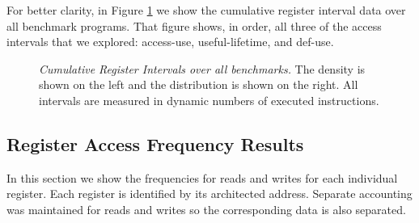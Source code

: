 \documentclass[10pt,dvips]{article}
\begin{document}
For better clarity,
in Figure \ref{fig:a_rcum} we show the cumulative 
register interval data over all
benchmark programs.  
That figure shows, in order, all three of the access
intervals that we explored: access-use, useful-lifetime, and def-use.
%
\begin{figure}[tb]
\centering
{}
\caption{{\em Cumulative Register Intervals over all benchmarks.} 
The density is shown on the left and the distribution is shown
on the right.
All intervals are measured in dynamic numbers of executed instructions.}
\label{fig:a_rcum}
\end{figure}
%
%
\subsection{Register Access Frequency Results}
%
In this section we show the frequencies for reads and writes
for each individual register.  Each register is identified by
its architected address.  Separate accounting was maintained for
reads and writes so the corresponding data is also separated.
%
\end{document}
